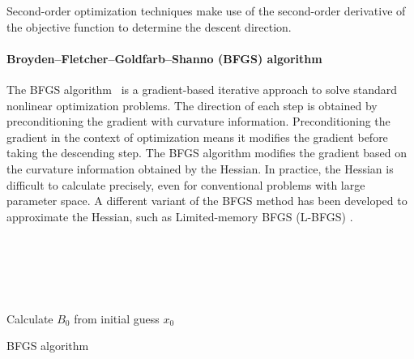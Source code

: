Second-order optimization techniques make use of the second-order derivative of the objective function to determine the descent direction. 

\paragraph{Broyden–Fletcher–Goldfarb–Shanno (BFGS) algorithm} %

The BFGS algorithm~\cite{broyden_convergence_1970,fletcher_new_1970,goldfarb_family_1970,shanno_conditioning_1970} is a gradient-based iterative approach to solve standard nonlinear optimization problems. The direction of each step is obtained by preconditioning the gradient with curvature information. Preconditioning the gradient in the context of optimization means it modifies the gradient before taking the descending step. The BFGS algorithm modifies the gradient based on the curvature information obtained by the Hessian. In practice, the Hessian is difficult to calculate precisely, even for conventional problems with large parameter space. A different variant of the BFGS method has been developed to approximate the Hessian, such as Limited-memory BFGS (L-BFGS) \cite{byrdt_limited_nodate}. 

\vspace{0.5cm}


\begin{algorithm}[H]
 \\
\\
\\
\\

\SetAlgoNoLine%

Calculate $B_0$ from initial guess $x_0$\;

 \caption{BFGS algorithm}
\end{algorithm}

